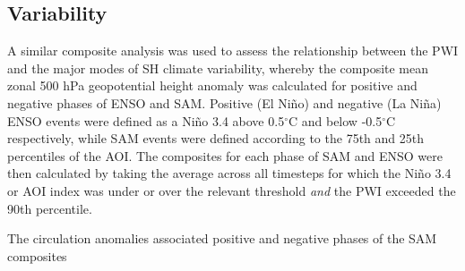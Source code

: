 \subsection{Variability}

A similar composite analysis was used to assess the relationship between the PWI and the major modes of SH climate variability, whereby the composite mean zonal 500 hPa geopotential height anomaly was calculated for positive and negative phases of ENSO and SAM. Positive (El Ni\~{n}o) and negative (La Ni\~{n}a) ENSO events were defined as a Ni\~{n}o 3.4 above 0.5$^{\circ}$C and below -0.5$^{\circ}$C respectively, while SAM events were defined according to the 75th and 25th percentiles of the AOI. The composites for each phase of SAM and ENSO were then calculated by taking the average across all timesteps for which the Ni\~{n}o 3.4 or AOI index was under or over the relevant threshold \textit{and} the PWI exceeded the 90th percentile. 

The circulation anomalies associated positive and negative phases of the SAM composites 